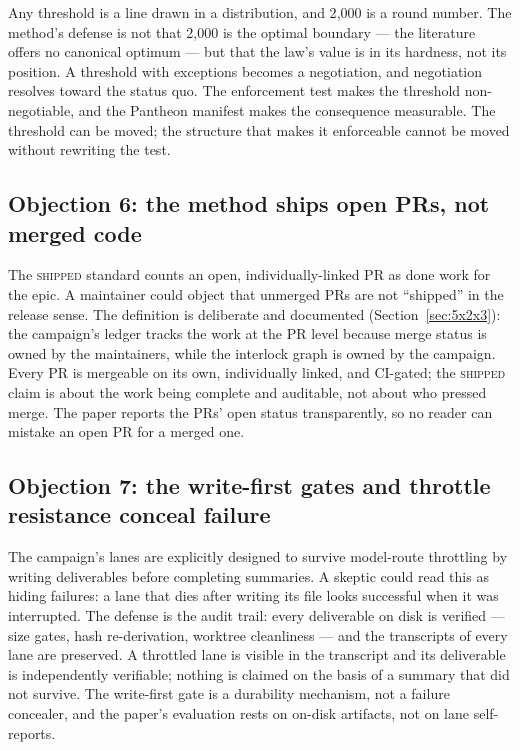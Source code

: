 \documentclass[11pt]{article}
\theoremstyle{definition}
\theoremstyle{plain}
\theoremstyle{remark}
\begin{document}
Any threshold is a line drawn in a distribution, and 2{,}000 is a round
number. The method's defense is not that 2{,}000 is the optimal boundary ---
the literature offers no canonical optimum --- but that the law's value is in
its hardness, not its position. A threshold with exceptions becomes a
negotiation, and negotiation resolves toward the status quo. The enforcement
test makes the threshold non-negotiable, and the Pantheon manifest makes the
consequence measurable. The threshold can be moved; the structure that makes
it enforceable cannot be moved without rewriting the test.

\subsection{Objection 6: the method ships open PRs, not merged code}

The \textsc{shipped} standard counts an open, individually-linked PR as done
work for the epic. A maintainer could object that unmerged PRs are not
``shipped'' in the release sense. The definition is deliberate and documented
(Section~\ref{sec:5x2x3}): the campaign's ledger tracks the work at the PR
level because merge status is owned by the maintainers, while the interlock
graph is owned by the campaign. Every PR is mergeable on its own,
individually linked, and CI-gated; the \textsc{shipped} claim is about the
work being complete and auditable, not about who pressed merge. The paper
reports the PRs' open status transparently, so no reader can mistake an open
PR for a merged one.

\subsection{Objection 7: the write-first gates and throttle resistance conceal failure}

The campaign's lanes are explicitly designed to survive model-route
throttling by writing deliverables before completing summaries. A skeptic
could read this as hiding failures: a lane that dies after writing its file
looks successful when it was interrupted. The defense is the audit trail:
every deliverable on disk is verified --- size gates, hash re-derivation,
worktree cleanliness --- and the transcripts of every lane are preserved. A
throttled lane is visible in the transcript and its deliverable is
independently verifiable; nothing is claimed on the basis of a summary that
did not survive. The write-first gate is a durability mechanism, not a
failure concealer, and the paper's evaluation rests on on-disk artifacts, not
on lane self-reports.
\end{document}
